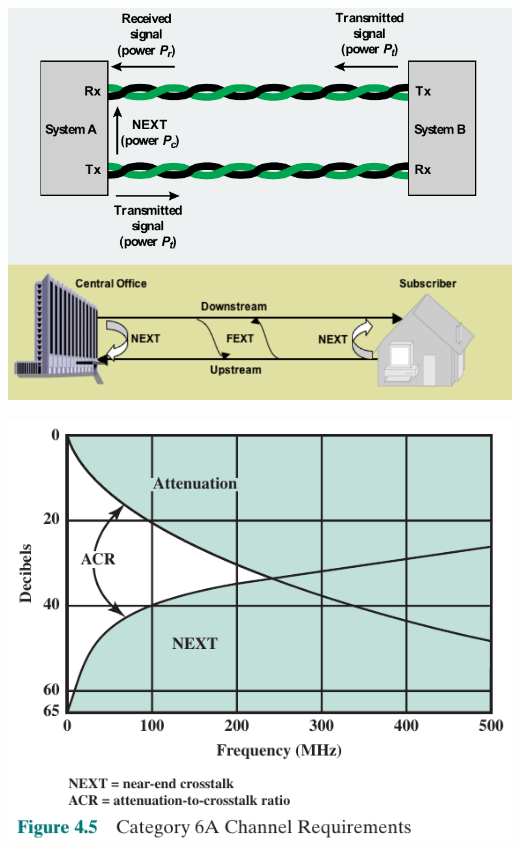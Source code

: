 \documentclass[pdflatex,compress]{beamer}
\begin{document}
\begin{frame}
	\begin{center}
		\includegraphics[width=0.8\linewidth]{img/img09}
	\end{center}
\end{frame}

\begin{frame}
	\begin{center}
		\includegraphics[width=0.7\linewidth]{img/img10}
	\end{center}
\end{frame}
\end{document}
